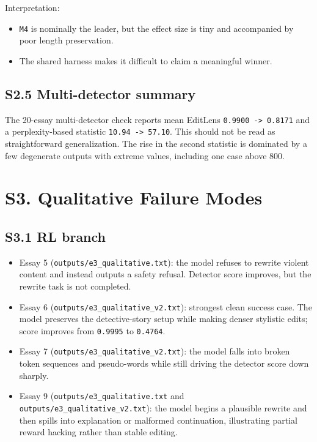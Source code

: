 \documentclass[11pt]{article}
\begin{document}
Interpretation:

\begin{itemize}
\item \texttt{M4} is nominally the leader, but the effect size is tiny and accompanied by poor length preservation.
\item The shared harness makes it difficult to claim a meaningful winner.
\end{itemize}

\subsection*{S2.5 Multi-detector summary}

The 20-essay multi-detector check reports mean EditLens \texttt{0.9900 -> 0.8171} and a perplexity-based statistic \texttt{10.94 -> 57.10}. This should not be read as straightforward generalization. The rise in the second statistic is dominated by a few degenerate outputs with extreme values, including one case above 800.

\section*{S3. Qualitative Failure Modes}

\subsection*{S3.1 RL branch}

\begin{itemize}
\item Essay 5 (\texttt{outputs/e3\_qualitative.txt}): the model refuses to rewrite violent content and instead outputs a safety refusal. Detector score improves, but the rewrite task is not completed.
\item Essay 6 (\texttt{outputs/e3\_qualitative\_v2.txt}): strongest clean success case. The model preserves the detective-story setup while making denser stylistic edits; score improves from \texttt{0.9995} to \texttt{0.4764}.
\item Essay 7 (\texttt{outputs/e3\_qualitative\_v2.txt}): the model falls into broken token sequences and pseudo-words while still driving the detector score down sharply.
\item Essay 9 (\texttt{outputs/e3\_qualitative.txt} and \texttt{outputs/e3\_qualitative\_v2.txt}): the model begins a plausible rewrite and then spills into explanation or malformed continuation, illustrating partial reward hacking rather than stable editing.
\end{itemize}
\end{document}
